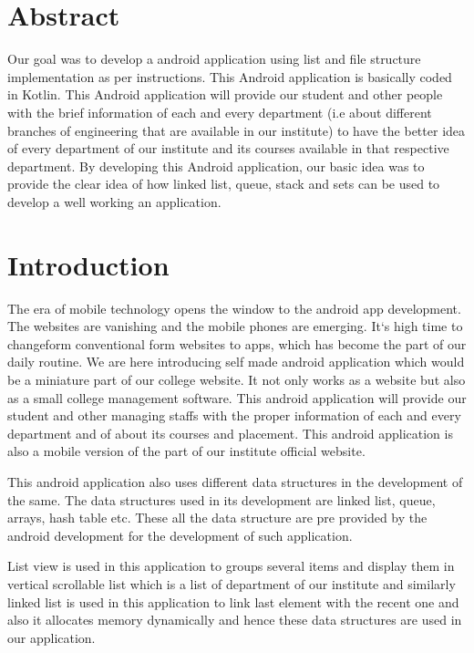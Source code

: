\documentclass[11pt,a4paper]{report}
\begin{document}
\chapter{Abstract}		

Our goal was to develop a android application using list and file structure implementation as per instructions. This Android application is basically coded in Kotlin. This Android application will provide our 
student and other people with the brief information of each and every department (i.e about different branches of engineering that are available in our institute) to have the better idea of every department of 
our institute and its courses available in that respective department. By developing this Android application, our basic idea was to provide the clear idea of how linked list, queue, stack and sets can be used 
to develop a well working an application.
\vspace{5pt} 


\tableofcontents

\chapter{Introduction}

The era of mobile technology opens the window to the android app development. The websites are vanishing and the mobile phones are emerging. It`s high time to changeform conventional form websites to apps, which 
has become the part of our daily routine. We are here introducing self made android application which would be a miniature part of our college website. It not only works as a website but also as a small college 
management software. This android application will provide our student and other managing staffs with the proper information of each and every department and of about its courses and placement. This android 
application is also a mobile version of the part of our institute official website.

This android application also uses different data structures in the development of the same. The data structures used in its development are linked list, queue, arrays, hash table etc. These all the data structure
 are pre provided by the android development for the development of such application.
 
 List view is used in this application to groups several items and display them in vertical scrollable list which is a list of department of our institute and similarly linked list is used in this application to 
 link last element with the recent one and also it allocates memory dynamically and hence these data structures are used in our application.
\end{document}

